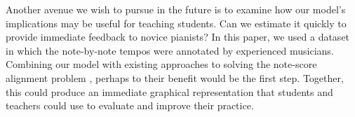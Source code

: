 \documentclass[aoas]{imsart}
\begin{document}
Another avenue we wish to pursue in the future is to examine how our
model's implications may be useful for teaching students. Can we
estimate it quickly to provide immediate feedback to novice pianists?
In this paper, we used a dataset in which the note-by-note tempos were
annotated by experienced musicians. Combining our model with existing
approaches to solving the note-score alignment problem
\citep{LangFreitas2005,Raphael2002,DannenbergRaphael2006}, perhaps to
their benefit would be the first step. Together, this could produce an
immediate graphical representation that students and teachers could
use to evaluate and improve their practice.


\begin{supplement}


  \label{supp}

\end{supplement}


\clearpage





\end{document}
